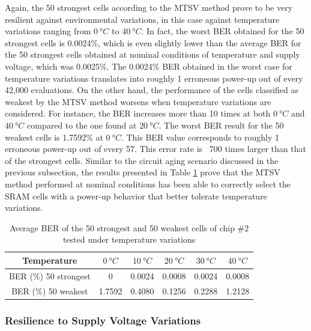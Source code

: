 Again, the 50 strongest cells according to the MTSV method prove to be very resilient against environmental variations, in this case against temperature variations ranging from $\SI{0}{\degree C}$ to $\SI{40}{\degree C}$. In fact, the worst BER obtained for the 50 strongest cells is 0.0024\%, which is even slightly lower than the average BER for the 50 strongest cells obtained at nominal conditions of temperature and supply voltage, which was 0.0025\%. The 0.0024\% BER obtained in the worst case for temperature variations translates into roughly 1 erroneous power-up out of every 42,000 evaluations. On the other hand, the performance of the cells classified as weakest by the MTSV method worsens when temperature variations are considered. For instance, the BER increases more than 10 times at both $\SI{0}{\degree C}$ and $\SI{40}{\degree C}$ compared to the one found at $\SI{20}{\degree C}$. The worst BER result for the 50 weakest cells is 1.7592\% at $\SI{0}{\degree C}$. This BER value corresponds to roughly 1 erroneous power-up out of every 57. This error rate is ~700 times larger than that of the strongest cells.
Similar to the circuit aging scenario discussed in the previous subsection, the results presented in Table \ref{tab:temp_ave_BER} prove that the MTSV method performed at nominal conditions has been able to correctly select the SRAM cells with a power-up behavior that better tolerate temperature variations. 


\begin{table}[H]
  \centering
  \caption{Average BER of the 50 strongest and 50 weakest cells of chip \#2 tested under temperature variations}
  \vspace{5mm}
    \begin{tabular}{|c|c|c|c|c|c|}
    \hline
     Temperature & $\SI{0}{\degree C}$ & $\SI{10}{\degree C}$ & $\SI{20}{\degree C}$ & $\SI{30}{\degree C}$ & $\SI{40}{\degree C}$ \bigstrut\\
    \hline
    BER (\%) 50 strongest & 0 & 0.0024 & 0.0008 & 0.0024 & 0.0008\bigstrut\\
    \hline
    BER (\%) 50 weakest & 1.7592 & 0.4080 & 0.1256 & 0.2288 & 1.2128 \bigstrut\\
    \hline
    \end{tabular}%
  \label{tab:temp_ave_BER}%
\end{table}%

\subsubsection{Resilience to Supply Voltage Variations}

